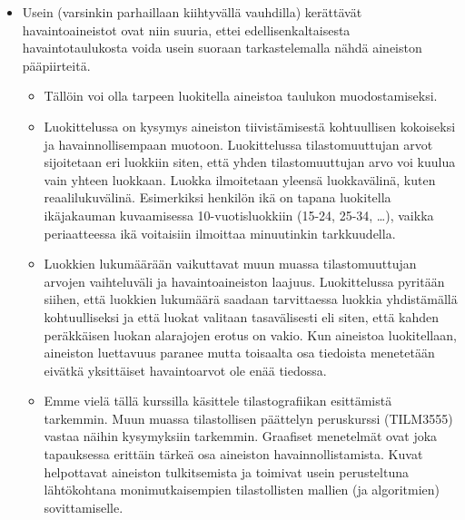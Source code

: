 \documentclass[
]{book}
\providecommand{\tightlist}{%
  \setlength{\itemsep}{0pt}\setlength{\parskip}{0pt}}
\begin{document}
\begin{itemize}
\tightlist
\item
  Usein (varsinkin parhaillaan kiihtyvällä vauhdilla) kerättävät havaintoaineistot ovat niin suuria, ettei edellisenkaltaisesta havaintotaulukosta voida usein suoraan tarkastelemalla nähdä aineiston pääpiirteitä.

  \begin{itemize}
  \tightlist
  \item
    Tällöin voi olla tarpeen luokitella aineistoa taulukon muodostamiseksi.\\
  \item
    Luokittelussa on kysymys aineiston tiivistämisestä kohtuullisen kokoiseksi ja havainnollisempaan muotoon. Luokittelussa tilastomuuttujan arvot sijoitetaan eri luokkiin siten, että yhden tilastomuuttujan arvo voi kuulua vain yhteen luokkaan. Luokka ilmoitetaan yleensä luokkavälinä, kuten reaalilukuvälinä. Esimerkiksi henkilön ikä on tapana luokitella ikäjakauman kuvaamisessa 10-vuotisluokkiin (15-24, 25-34, \ldots), vaikka periaatteessa ikä voitaisiin ilmoittaa minuutinkin tarkkuudella.\\
  \item
    Luokkien lukumäärään vaikuttavat muun muassa tilastomuuttujan arvojen vaihteluväli ja havaintoaineiston laajuus. Luokittelussa pyritään siihen, että luokkien lukumäärä saadaan tarvittaessa luokkia yhdistämällä kohtuulliseksi ja että luokat valitaan tasavälisesti eli siten, että kahden peräkkäisen luokan alarajojen erotus on vakio. Kun aineistoa luokitellaan, aineiston luettavuus paranee mutta toisaalta osa tiedoista menetetään eivätkä yksittäiset havaintoarvot ole enää tiedossa.\\
  \item
    Emme vielä tällä kurssilla käsittele tilastografiikan esittämistä tarkemmin. Muun muassa tilastollisen päättelyn peruskurssi (TILM3555) vastaa näihin kysymyksiin tarkemmin. Graafiset menetelmät ovat joka tapauksessa erittäin tärkeä osa aineiston havainnollistamista. Kuvat helpottavat aineiston tulkitsemista ja toimivat usein perusteltuna lähtökohtana monimutkaisempien tilastollisten mallien (ja algoritmien) sovittamiselle.
  \end{itemize}
\end{itemize}

\hfill\break
\end{document}
